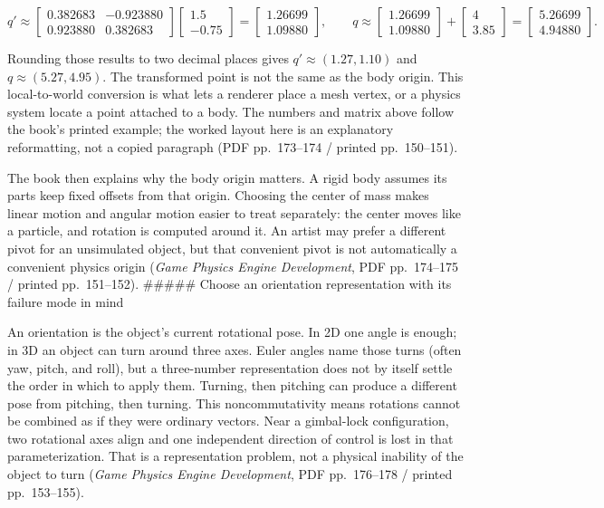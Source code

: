 \[
q' \approx \begin{bmatrix}0.382683&-0.923880\\0.923880&0.382683\end{bmatrix}
\begin{bmatrix}1.5\\-0.75\end{bmatrix}
= \begin{bmatrix}1.26699\\1.09880\end{bmatrix},
\qquad
q \approx \begin{bmatrix}1.26699\\1.09880\end{bmatrix}
+ \begin{bmatrix}4\\3.85\end{bmatrix}
= \begin{bmatrix}5.26699\\4.94880\end{bmatrix}.
\]

Rounding those results to two decimal places gives \(q'\approx(1.27,1.10)\) and \(q\approx(5.27,4.95)\). The transformed point is not the same as the body origin. This local-to-world conversion is what lets a renderer place a mesh vertex, or a physics system locate a point attached to a body. The numbers and matrix above follow the book's printed example; the worked layout here is an explanatory reformatting, not a copied paragraph (PDF pp.~173--174 / printed pp.~150--151).

The book then explains why the body origin matters. A rigid body assumes its parts keep fixed offsets from that origin. Choosing the center of mass makes linear motion and angular motion easier to treat separately: the center moves like a particle, and rotation is computed around it. An artist may prefer a different pivot for an unsimulated object, but that convenient pivot is not automatically a convenient physics origin (\emph{Game Physics Engine Development}, PDF pp.~174--175 / printed pp.~151--152). \#\#\#\#\# Choose an orientation representation with its failure mode in mind

An orientation is the object's current rotational pose. In 2D one angle is enough; in 3D an object can turn around three axes. Euler angles name those turns (often yaw, pitch, and roll), but a three-number representation does not by itself settle the order in which to apply them. Turning, then pitching can produce a different pose from pitching, then turning. This noncommutativity means rotations cannot be combined as if they were ordinary vectors. Near a gimbal-lock configuration, two rotational axes align and one independent direction of control is lost in that parameterization. That is a representation problem, not a physical inability of the object to turn (\emph{Game Physics Engine Development}, PDF pp.~176--178 / printed pp.~153--155).

